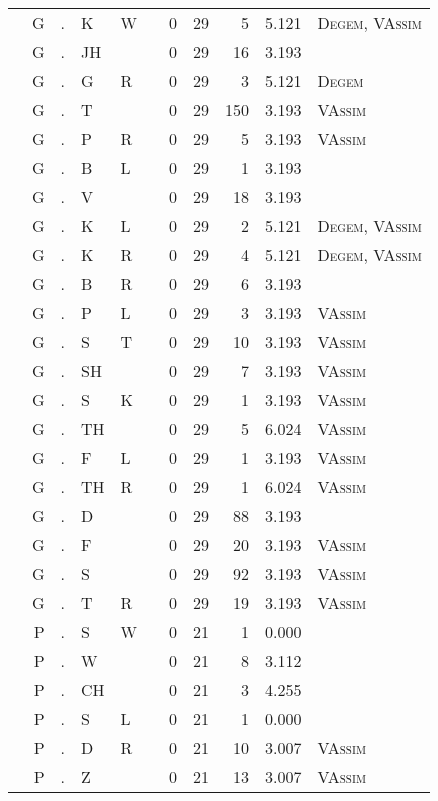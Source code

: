 \begin{longtable}{r@{ } r@{ } c@{ } l@{ } l@{ } l@{ } r r r r l }
 & G & . & K & W &  & 0 & 29 & 5 & 5.121 & \textsc{Degem}, \textsc{VAssim} \\
 & G & . & JH &  &  & 0 & 29 & 16 & 3.193 &  \\
 & G & . & G & R &  & 0 & 29 & 3 & 5.121 & \textsc{Degem} \\
 & G & . & T &  &  & 0 & 29 & 150 & 3.193 & \textsc{VAssim} \\
 & G & . & P & R &  & 0 & 29 & 5 & 3.193 & \textsc{VAssim} \\
 & G & . & B & L &  & 0 & 29 & 1 & 3.193 &  \\
 & G & . & V &  &  & 0 & 29 & 18 & 3.193 &  \\
 & G & . & K & L &  & 0 & 29 & 2 & 5.121 & \textsc{Degem}, \textsc{VAssim} \\
 & G & . & K & R &  & 0 & 29 & 4 & 5.121 & \textsc{Degem}, \textsc{VAssim} \\
 & G & . & B & R &  & 0 & 29 & 6 & 3.193 &  \\
 & G & . & P & L &  & 0 & 29 & 3 & 3.193 & \textsc{VAssim} \\
 & G & . & S & T &  & 0 & 29 & 10 & 3.193 & \textsc{VAssim} \\
 & G & . & SH &  &  & 0 & 29 & 7 & 3.193 & \textsc{VAssim} \\
 & G & . & S & K &  & 0 & 29 & 1 & 3.193 & \textsc{VAssim} \\
 & G & . & TH &  &  & 0 & 29 & 5 & 6.024 & \textsc{VAssim} \\
 & G & . & F & L &  & 0 & 29 & 1 & 3.193 & \textsc{VAssim} \\
 & G & . & TH & R &  & 0 & 29 & 1 & 6.024 & \textsc{VAssim} \\
 & G & . & D &  &  & 0 & 29 & 88 & 3.193 &  \\
 & G & . & F &  &  & 0 & 29 & 20 & 3.193 & \textsc{VAssim} \\
 & G & . & S &  &  & 0 & 29 & 92 & 3.193 & \textsc{VAssim} \\
 & G & . & T & R &  & 0 & 29 & 19 & 3.193 & \textsc{VAssim} \\
 & P & . & S & W &  & 0 & 21 & 1 & 0.000 &  \\
 & P & . & W &  &  & 0 & 21 & 8 & 3.112 &  \\
 & P & . & CH &  &  & 0 & 21 & 3 & 4.255 &  \\
 & P & . & S & L &  & 0 & 21 & 1 & 0.000 &  \\
 & P & . & D & R &  & 0 & 21 & 10 & 3.007 & \textsc{VAssim} \\
 & P & . & Z &  &  & 0 & 21 & 13 & 3.007 & \textsc{VAssim} \\

\end{longtable}
